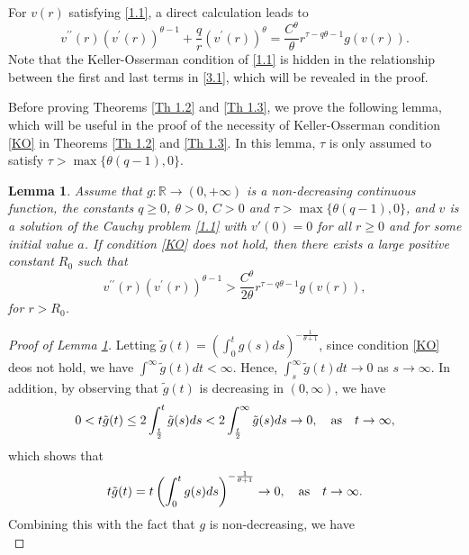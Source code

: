 \documentclass[a4paper,11pt]{amsart}
\theoremstyle{plain}
\newtheorem{Lemma}{Lemma}[section]
\theoremstyle{remark}
\numberwithin{equation}{section}
\numberwithin{figure}{section}
\numberwithin{remark}{section}
\begin{document}
\begin{sloppypar}
For $v(r)$ satisfying \eqref{1.1}, a direct calculation leads to
\begin{equation}\label{3.1}
v^{\prime\prime}(r)\left( v^{\prime}(r)\right)^{\theta -1}+\frac{q}{r}\left( v^{\prime}(r)\right)^{\theta}
=\frac{C^\theta}{\theta} r^{\tau - q \theta -1} g(v(r)).
\end{equation}
Note that the Keller-Osserman condition of \eqref{1.1} is hidden in the relationship between the first  and last terms in \eqref{3.1}, which will be revealed in the proof.

Before proving Theorems \ref{Th 1.2} and \ref{Th 1.3}, we prove the following lemma, which will be useful in the proof of the necessity of Keller-Osserman condition \eqref{KO} in Theorems \ref{Th 1.2} and \ref{Th 1.3}. In this lemma, $\tau$ is only assumed to satisfy $\tau > \max \{\theta (q-1), 0\}$. 
\begin{Lemma}\label{Lem 3.1}
Assume that $g: \mathbb{R} \to (0,+\infty)$ is a non-decreasing continuous function, the constants $q\ge 0$, $\theta> 0$, $C>0$ and $\tau > \max \{\theta (q-1), 0\}$, and $v$ is a solution of the Cauchy problem \eqref{1.1} with $v'(0)=0$ for all $r\ge 0$ and for some initial value $a$.
If condition \eqref{KO} does not hold, then there exists a large positive constant $R_0$ such that
\begin{equation}\label{claim}
v^{\prime\prime}(r)\left( v^{\prime}(r)\right)^{\theta -1} > \frac{C^\theta}{2\theta} r^{\tau - q \theta -1} g(v(r)),
\end{equation}
for $r>R_0$.
\end{Lemma}
\begin{proof}[Proof of Lemma \ref{Lem 3.1}]
Letting
$\tilde g(t)=\left( \int_{0}^{t}g (s)ds\right)^{-\frac{1}{\theta+1}}$, since condition \eqref{KO} deos not hold, we have  $\int^{\infty}\tilde g(t) dt<\infty$. Hence, $\int_s^{\infty}\tilde g(t)dt\to 0$ as $s\to \infty$. In addition, by observing that $\tilde g(t)$ is decreasing in $(0, \infty)$, we have
\begin{equation*}
	0<t \tilde g(t)\leq 2\int_{\frac{t}{2}}^{t}\tilde g(s)ds
	<2\int_{\frac{t}{2}}^{\infty}\tilde g(s)ds \to 0, \quad {\rm as} \quad t\to \infty,
\end{equation*}
which shows that
\begin{equation*}
	t \tilde g(t)=t \left( \int_{0}^{t}g (s)ds\right)^{-\frac{1}{\theta+1}}\to 0,\quad {\rm as} \quad t\to \infty.
\end{equation*}
Combining this with the fact that $g$ is non-decreasing, we have
\begin{equation*}

\end{equation*}
\end{proof}
\end{sloppypar}
\end{document}
